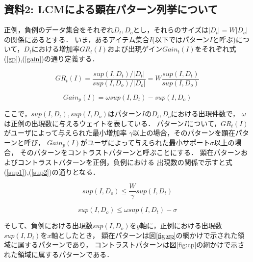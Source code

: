 \subsection{資料2: LCMによる顕在パターン列挙について}

正例，負例のデータ集合をそれぞれ$D_t,D_o$とし，それらのサイズは$|D_t|=W |D_o|$の関係にあるとする．
いま，あるアイテム集合$I$(以下ではパターン$I$と呼ぶ)について，$D_t$における増加率$GR_t(I)$および出現ゲイン$Gain_t(I)$をそれぞれ式(\ref{gp}),(\ref{gain})の通り定義する．

\begin{equation}
GR_t(I)=\frac{sup(I,D_t)/|D_t|}{sup(I,D_o)/|D_o|}=W\frac{sup(I,D_t)}{sup(I,D_o)} \label{gp}
\end{equation}

\begin{equation}
Gain_p(I)=\omega sup(I,D_t) - sup(I,D_o) \label{gain}
\end{equation}

ここで，$sup(I,D_t),sup(I,D_o)$はパターン$I$の$D_t,D_o$における出現件数で，
$\omega$は正例の出現数に与えるウェイトを表している．
パターン$I$について，$GR_t(I)$がユーザによって与えられた最小増加率
$\gamma$以上の場合，そのパターンを顕在パターンと呼び，
$Gain_p(I)$がユーザによって与えられた最小サポート$\sigma$以上の場合，
そのパターンをコントラストパターンと呼ぶことにする．
顕在パターンおよびコントラストパターンを正例，負例における
出現数の関係で示すと式(\ref{sup1}),(\ref{sup2})の通りとなる．

\begin{equation}
sup(I,D_o)\le \frac{W}{\gamma} sup(I,D_t) \label{sup1}
\end{equation}

\begin{equation}
sup(I,D_o)\le \omega sup(I,D_t) - \sigma \label{sup2}
\end{equation}

そして、負例における出現数$sup(I,D_o)$を$y$軸に，正例における出現数$sup(I,D_t)$を$x$軸としたとき，
顕在パターンは図\ref{fig:ep}の網かけで示された領域に属するパターンであり，
コントラストパターンは図\ref{fig:cp}の網かけで示された領域に属するパターンである．

